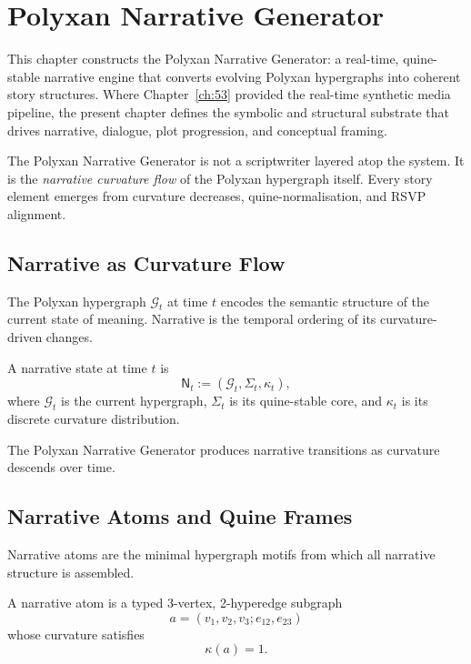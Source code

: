 \chapter{Polyxan Narrative Generator}
\label{ch:54}

This chapter constructs the Polyxan Narrative Generator: a real-time,
quine-stable narrative engine that converts evolving Polyxan hypergraphs into
coherent story structures.  
Where Chapter~\ref{ch:53} provided the real-time synthetic media pipeline, the
present chapter defines the symbolic and structural substrate that drives
narrative, dialogue, plot progression, and conceptual framing.

The Polyxan Narrative Generator is not a scriptwriter layered atop the system.
It is the \emph{narrative curvature flow} of the Polyxan hypergraph itself.
Every story element emerges from curvature decreases, quine-normalisation, and
RSVP alignment.


\section{Narrative as Curvature Flow}
\label{sec:54:narrative-as-curvature-flow}

The Polyxan hypergraph $\mathcal{G}_t$ at time $t$ encodes the semantic
structure of the current state of meaning.  
Narrative is the temporal ordering of its curvature-driven changes.

\begin{definition}
A narrative state at time $t$ is
\[
\mathsf{N}_t := (\mathcal{G}_t, \Sigma_t, \kappa_t),
\]
where $\mathcal{G}_t$ is the current hypergraph,
$\Sigma_t$ is its quine-stable core, and
$\kappa_t$ is its discrete curvature distribution.
\end{definition}

The Polyxan Narrative Generator produces narrative transitions as curvature
descends over time.


\section{Narrative Atoms and Quine Frames}
\label{sec:54:atoms}

Narrative atoms are the minimal hypergraph motifs from which all narrative
structure is assembled.

\begin{definition}
A narrative atom is a typed 3-vertex, 2-hyperedge subgraph
\[
a = (v_1,v_2,v_3; e_{12}, e_{23})
\]
whose curvature satisfies
\[
\kappa(a) = 1.
\]
\end{definition}

